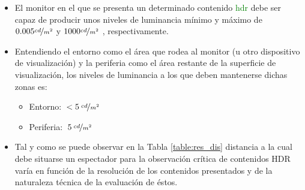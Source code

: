 \documentclass[a4paper, 12pt]{report}
\begin{document}
\begin{itemize}
  \item  El monitor en el que se presenta un  determinado contenido \textcolor{green}{hdr} debe ser capaz de producir unos niveles de luminancia mínimo y máximo de  $ 0.005 \nicefrac{cd}{m^{2}}$ y   $1000 \nicefrac{cd}{m^{2}}$ , respectivamente. 
  \item Entendiendo el entorno como el área que rodea al monitor (u otro dispositivo de visualización) y la periferia como el área restante de la superficie de visualización, los niveles de luminancia a los que deben mantenerse  dichas zonas es:
        \begin{itemize}
            \item Entorno:  $\:<5\: \nicefrac{cd}{m^{2}}$ 
            \item Periferia:  $\:5\: \nicefrac{cd}{m^{2}}$ 
        \end{itemize}
  \item  Tal y como se puede observar en la Tabla \ref{table:res_dis} distancia a la cual debe situarse un espectador para la observación crítica de contenidos HDR varía en función de la resolución de los contenidos presentados y de la naturaleza técnica de la evaluación de éstos.
\end{itemize}
\end{document}
